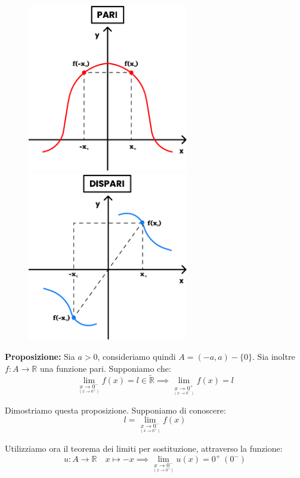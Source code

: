 \documentclass{article}
\begin{document}
\begin{figure}[!h]
    \centering
    \includegraphics[width=7cm]{./images/evenFunctions.pdf}\hfill
    \includegraphics[width=7cm]{./images/oddFunctions.pdf}
\end{figure}

\noindent\textbf{Proposizione:} Sia $a > 0$, consideriamo quindi $A = (-a, a) - \{0\}$. Sia inoltre $f: A \xrightarrow{} \mathbb{R}$ una funzione pari. Supponiamo che:
\begin{equation*}
    \lim_{ \underset{\scriptstyle (x \to 0^+)}{x \to 0^-}} f(x) = l \in \widetilde{\mathbb{R}} \implies \lim_{ \underset{\scriptstyle (x \to 0^-)}{x \to 0^+}} f(x) = l
\end{equation*}

\noindent Dimostriamo questa proposizione. Supponiamo di conoscere:
\begin{equation*}
    l = \lim_{\underset{\scriptstyle (x \to 0^+)}{x \to 0^-}} f(x)
\end{equation*}

\noindent Utilizziamo ora il teorema dei limiti per sostituzione, attraverso la funzione:
\begin{equation*}
    u: A \xrightarrow{} \mathbb{R} \quad x \longmapsto -x \implies \lim_{\underset{\scriptstyle (x \to 0^+)}{x \to 0^-}} u(x) = 0^+ \ (0^-)
\end{equation*}
\end{document}
